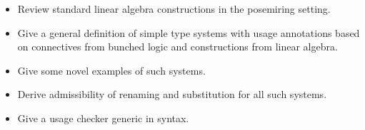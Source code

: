 \begin{itemize}
  \item Review standard linear algebra constructions in the posemiring setting.
  \item Give a general definition of simple type systems with usage annotations
    based on connectives from bunched logic and constructions from linear
    algebra.
  \item Give some novel examples of such systems.
  \item Derive admissibility of renaming and substitution for all such systems.
  \item Give a usage checker generic in syntax.
\end{itemize}
